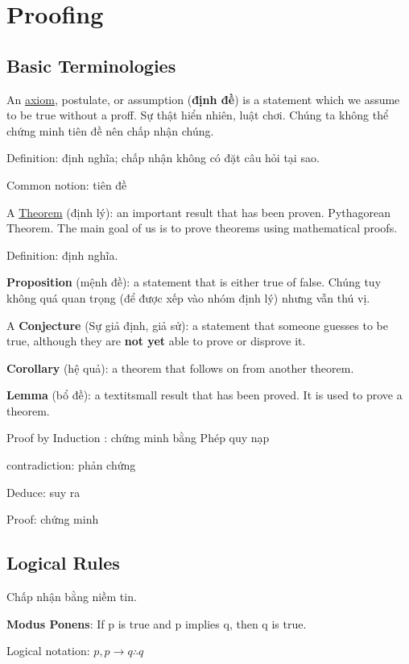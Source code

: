 \chapter{Proofing}

\section{Basic Terminologies}

An \href{https://en.wikipedia.org/wiki/Axiom}{axiom}, postulate, or assumption (\textbf{định đề}) is a statement which we assume to be true without a proff. Sự thật hiển nhiên, luật chơi. Chúng ta không thể chứng minh tiên đề nên chấp nhận chúng.

Definition: định nghĩa; chấp nhận không có đặt câu hỏi tại sao.

Common notion: tiên đề

A \href{https://en.wikipedia.org/wiki/Theorem}{Theorem} (định lý): an important result that has been proven. Pythagorean Theorem. The main goal of us is to prove theorems using mathematical proofs.

Definition: định nghĩa.

\textbf{Proposition} (mệnh đề): a statement that is either true of false. Chúng tuy không quá quan trọng (để được xếp vào nhóm định lý) nhưng vẫn thú vị.

A \textbf{Conjecture} (Sự giả định, giả sử): a statement that someone guesses to be true, although they are \textbf{not yet} able to prove or disprove it.

\textbf{Corollary} (hệ quả): a theorem that follows on from another theorem.

\textbf{Lemma} (bổ đề): a textit{small} result that has been proved. It is used to prove a theorem.

Proof by Induction : chứng minh bằng Phép quy nạp

contradiction: phản chứng

Deduce: suy ra

Proof: chứng minh

\section{Logical Rules}

Chấp nhận bằng niềm tin.

\noindent \textbf{Modus Ponens}: If p is true and p implies q, then q is true.

Logical notation: \(p,p \rightarrow q \therefore q\)

